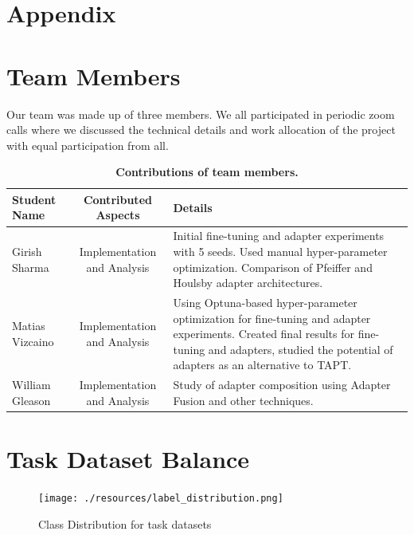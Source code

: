 \documentclass[10pt,twocolumn,letterpaper]{article}
\begin{document}
\onecolumn
\section{Appendix}

\appendix
\renewcommand{\thesection}{Appendix \Alph{section}}
\renewcommand{\thefigure}{\Alph{section}.\arabic{figure}}
\renewcommand{\thetable}{\Alph{section}.\arabic{table}}



\section{Team Members}
Our team was made up of three members. We all participated in periodic zoom calls where we discussed the technical details and work allocation of the project with equal participation from all.

\begin{table}[h]
\begin{center}
\begin{tabular}{|l|c|p{8cm}|}
\hline
\textbf{Student Name} & \textbf{Contributed Aspects} & \textbf{Details} \\
\hline
Girish Sharma & Implementation and Analysis & Initial fine-tuning and adapter experiments with 5 seeds. Used manual hyper-parameter optimization. Comparison of Pfeiffer and Houlsby adapter architectures.  \\
Matias Vizcaino & Implementation and Analysis & Using Optuna-based hyper-parameter optimization for fine-tuning and adapter experiments. Created final results for fine-tuning and adapters, studied the potential of adapters as an alternative to TAPT. \\
William Gleason & Implementation and Analysis & Study of adapter composition using Adapter Fusion and other techniques. \\
\hline
\end{tabular}
\end{center}
\caption{\textbf{Contributions of team members.}}
\label{tab:contributions}
\end{table}
\FloatBarrier


\section{Task Dataset Balance}
\begin{figure}[h] %
    \centering %
    \texttt{[image: ./resources/label\_distribution.png]} %
    \caption{Class Distribution for task datasets} %
    \label{fig:datasetbalance} %
\end{figure}
\end{document}
